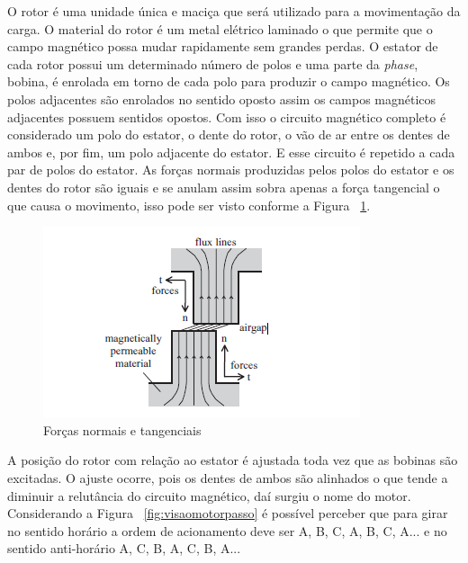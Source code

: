 O rotor é uma unidade única e maciça que será utilizado para a movimentação da carga. O material do rotor é um metal elétrico laminado o que permite que o campo magnético possa mudar rapidamente sem grandes perdas. O estator de cada rotor possui um determinado número de polos e uma parte da \emph{phase}, bobina, é enrolada em torno de cada polo para produzir o campo magnético. Os polos adjacentes são enrolados no sentido oposto assim os campos magnéticos adjacentes possuem sentidos opostos. Com isso o circuito magnético completo é considerado um polo do estator, o dente do rotor, o vão de ar entre os dentes de ambos e, por fim, um polo adjacente do estator. E esse circuito é repetido a cada par de polos do estator. As forças normais produzidas pelos polos do estator e os dentes do rotor são iguais e se anulam assim sobra apenas a força tangencial o que causa o movimento, isso pode ser visto conforme a Figura ~\ref{fig:forcamotorpassobainfusao}.

\begin{figure}[htp]
	\centering
	\includegraphics[scale=1]{images/forca_motor_passo.png}
	\caption{Forças normais e tangenciais}	
	\label{fig:forcamotorpassobainfusao}	
\end{figure}

A posição do rotor com relação ao estator é ajustada toda vez que as bobinas são excitadas. O ajuste ocorre, pois os dentes de ambos são alinhados o que tende a diminuir a relutância do circuito magnético, daí surgiu o nome do motor. Considerando a Figura ~\ref{fig:visaomotorpasso} é possível perceber que para girar no sentido horário a ordem de acionamento deve ser A, B, C, A, B, C, A... e no sentido anti-horário A, C, B, A, C, B, A...

